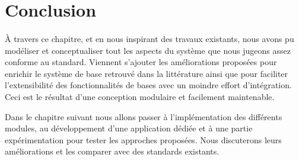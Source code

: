 \section{Conclusion}
\paragraph{}
À travers ce chapitre, et en nous inspirant des travaux existants, nous avons pu modéliser et conceptualiser tout les aspects du système que nous jugeons assez conforme au standard. Viennent s'ajouter les améliorations proposées pour enrichir le système de base retrouvé dans la littérature ainsi que pour faciliter l'extensibilité des fonctionnalités de bases avec un moindre effort d'intégration. Ceci est le résultat d'une conception modulaire et facilement maintenable. 
\par Dans le chapitre suivant nous allons passer à l'implémentation des différents modules, au développement d'une application dédiée et à une partie expérimentation pour tester les approches proposées. Nous discuterons leurs améliorations et les comparer avec des standards existants.



% 
% 

